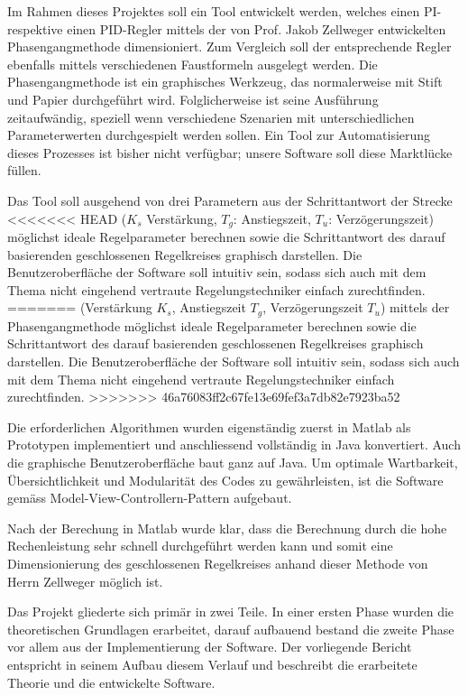 Im Rahmen dieses Projektes soll ein  Tool entwickelt werden, welches einen PI-  %
respektive einen PID-Regler mittels der von Prof. Jakob Zellweger entwickelten
Phasengangmethode                                                               %
dimensioniert. Zum Vergleich  soll der entsprechende Regler  ebenfalls mittels
verschiedenen  Faustformeln ausgelegt  werden. Die  Phasengangmethode ist  ein
graphisches Werkzeug,  das normalerweise  mit Stift und  Papier durchgef\"uhrt
wird. Folglicherweise  ist seine  Ausf\"uhrung zeitaufw\"andig,  speziell wenn
verschiedene  Szenarien  mit unterschiedlichen  Parameterwerten  durchgespielt
werden sollen. Ein Tool zur Automatisierung  dieses Prozesses ist bisher nicht
verf\"ugbar; unsere Software soll diese Marktl\"ucke f\"ullen.

Das Tool soll ausgehend von drei Parametern aus der Schrittantwort der Strecke  %
<<<<<<< HEAD
($K_s$ Verst\"arkung, $T_g$: Anstiegszeit, $T_u$: Verz\"ogerungszeit)           %
 m\"oglichst ideale  Regelparameter  berechnen
sowie  die Schrittantwort  des darauf  basierenden geschlossenen  Regelkreises
graphisch  darstellen. Die  Benutzeroberfl\"ache  der Software  soll  intuitiv
sein,   sodass   sich  auch   mit   dem   Thema  nicht   eingehend   vertraute
Regelungstechniker einfach zurechtfinden.
=======
(Verst\"arkung  $K_s$, Anstiegszeit  $T_g$, Verz\"ogerungszeit  $T_u$) mittels
der Phasengangmethode  m\"oglichst ideale  Regelparameter berechnen  sowie die
Schrittantwort  des darauf  basierenden  geschlossenen Regelkreises  graphisch
darstellen. Die Benutzeroberfl\"ache  der Software soll intuitiv  sein, sodass
sich auch mit  dem Thema nicht eingehend  vertraute Regelungstechniker einfach
zurechtfinden.
>>>>>>> 46a76083ff2c67fe13e69fef3a7db82e7923ba52

Die  erforderlichen   Algorithmen  wurden  eigenst\"andig  zuerst   in  Matlab %
als  Prototypen   implementiert  und   anschliessend  vollst\"andig   in  Java
konvertiert. Auch die  graphische Benutzeroberfl\"ache baut ganz  auf Java. Um
optimale  Wartbarkeit,  \"Ubersichtlichkeit  und Modularit\"at  des  Codes  zu
gew\"ahrleisten,  ist  die  Software  gem\"ass  Model-View-Controllern-Pattern
aufgebaut.

Nach  der Berechung  in  Matlab  wurde klar,  dass  die  Berechnung durch  die %
hohe Rechenleistung  sehr schnell  durchgef\"uhrt werden  kann und  somit eine
Dimensionierung des geschlossenen Regelkreises anhand dieser Methode von Herrn
Zellweger m\"oglich ist.

Das  Projekt gliederte  sich prim\"ar  in  zwei Teile. In  einer ersten  Phase %
wurden  die  theoretischen  Grundlagen erarbeitet,  darauf  aufbauend  bestand
die  zweite  Phase  vor  allem   aus  der  Implementierung  der  Software. Der
vorliegende Bericht entspricht in seinem  Aufbau diesem Verlauf und beschreibt die erarbeitete Theorie und die entwickelte Software.
